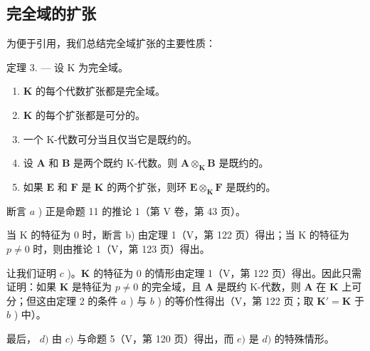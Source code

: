 \subsection{完全域的扩张}

为便于引用，我们总结完全域扩张的主要性质：

定理 3. --- 设 K 为完全域。

\begin{enumerate}
\def\labelenumi{\alph{enumi})}
\item
  \(\mathbf{K}\) 的每个代数扩张都是完全域。
\item
  \(\mathbf{K}\) 的每个扩张都是可分的。
\item
  一个 K-代数可分当且仅当它是既约的。
\item
  设 \(\mathbf{A}\) 和 \(\mathbf{B}\) 是两个既约 K-代数。则 \(\mathbf{A} \otimes_{\mathbf{K}} \mathbf{B}\) 是既约的。
\item
  如果 \(\mathbf{E}\) 和 \(\mathbf{F}\) 是 \(\mathbf{K}\) 的两个扩张，则环 \(\mathbf{E} \otimes_{\mathbf{K}} \mathbf{F}\) 是既约的。
\end{enumerate}

断言 \(a\) ) 正是命题 11 的推论 1（第 V 卷，第 43 页）。

当 K 的特征为 0 时，断言 b) 由定理 1（V，第 122 页）得出；当 K 的特征为 \(p \neq 0\) 时，则由推论 1（V，第 123 页）得出。

让我们证明 \(c\) )。\(\mathbf{K}\) 的特征为 0 的情形由定理 1（V，第 122 页）得出。因此只需证明：如果 \(\mathbf{K}\) 是特征为 \(p \neq 0\) 的完全域，且 \(\mathbf{A}\) 是既约 K-代数，则 \(\mathbf{A}\) 在 \(\mathbf{K}\) 上可分；但这由定理 2 的条件 \(a\) ) 与 \(b\) ) 的等价性得出（V，第 122 页；取 \(\mathbf{K}' = \mathbf{K}\) 于 \(b\) ) 中）。

最后， \(d)\) 由 \(c)\) 与命题 5（V，第 120 页）得出，而 \(e)\) 是 \(d)\) 的特殊情形。

